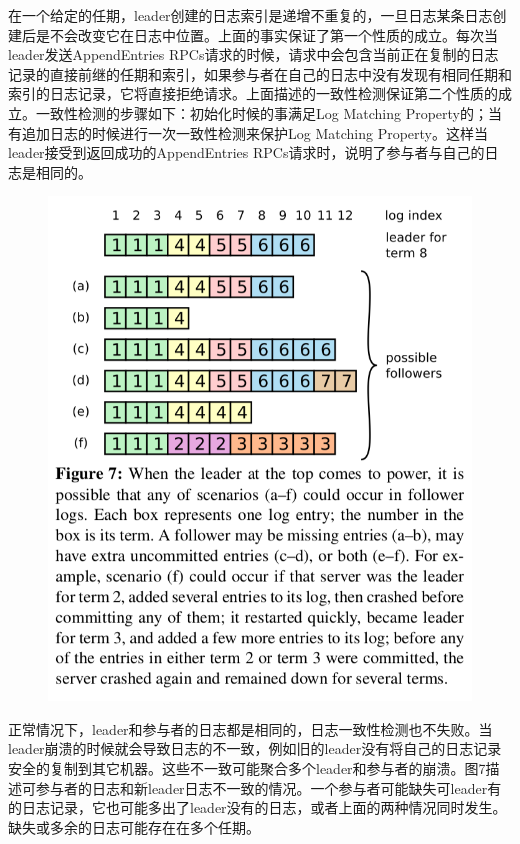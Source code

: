 \documentclass[journal]{IEEEtran}
\begin{document}
在一个给定的任期，leader创建的日志索引是递增不重复的，一旦日志某条日志创建后是不会改变它在日志中位置。上面的事实保证了第一个性质的成立。每次当leader发送AppendEntries RPCs请求的时候，请求中会包含当前正在复制的日志记录的直接前继的任期和索引，如果参与者在自己的日志中没有发现有相同任期和索引的日志记录，它将直接拒绝请求。上面描述的一致性检测保证第二个性质的成立。一致性检测的步骤如下：初始化时候的事满足Log Matching Property的；当有追加日志的时候进行一次一致性检测来保护Log Matching Property。这样当leader接受到返回成功的AppendEntries RPCs请求时，说明了参与者与自己的日志是相同的。
\begin{figure}[htbp]
\begin{center}
\includegraphics[width=1\linewidth]{./fig7.png}
\end{center}
\end{figure}

正常情况下，leader和参与者的日志都是相同的，日志一致性检测也不失败。当leader崩溃的时候就会导致日志的不一致，例如旧的leader没有将自己的日志记录安全的复制到其它机器。这些不一致可能聚合多个leader和参与者的崩溃。图7描述可参与者的日志和新leader日志不一致的情况。一个参与者可能缺失可leader有的日志记录，它也可能多出了leader没有的日志，或者上面的两种情况同时发生。缺失或多余的日志可能存在在多个任期。
\end{document}
